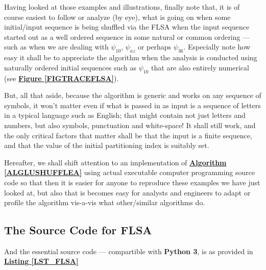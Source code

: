 \documentclass[a4paper, 18pt]{book} %
\begin{document}
Having looked at those examples and illustrations, finally note that, it is of course easiest to follow or analyze (by eye), what is going on when some initial/input sequence is being shuffled via the FLSA when the input sequence started out as a well ordered sequence in some natural or common ordering --- such as when we are dealing with $\psi_{10}$, $\psi_{az}$ or perhaps $\psi_{36}$. Especially note how easy it shall be to appreciate the algorithm when the analysis is conducted using naturally ordered initial sequences such as $\psi_{10}$ that are also entirely numerical (see \textbf{\hyperref[FIGTRACEFLSA]{Figure \ref{FIGTRACEFLSA}}}). 


But, all that aside, because the algorithm is generic and works on any sequence of symbols, it won't matter even if what is passed in as input is a sequence of letters in a typical language such as English; that might contain not just letters and numbers, but also symbols, punctuation and white-space! It shall still work, and the only critical factors that matter shall be that the input is a finite sequence, and that the value of the initial partitioning index is suitably set.

Hereafter, we shall shift attention to an implementation of \textbf{\hyperref[ALGLUSHUFFLEA]{Algorithm \ref{ALGLUSHUFFLEA}}} using actual executable computer programming source code so that then it is easier for anyone to reproduce these examples we have just looked at, but also that is becomes easy for analysts and engineers to adapt or profile the algorithm vis-a-vis what other/similar algorithms do.


\subsection{The Source Code for FLSA}

And the essential source code --- compartible with \textbf{Python 3}, is as provided in \textbf{\hyperref[LST_FLSA]{Listing \ref{LST_FLSA}}}
\end{document}
